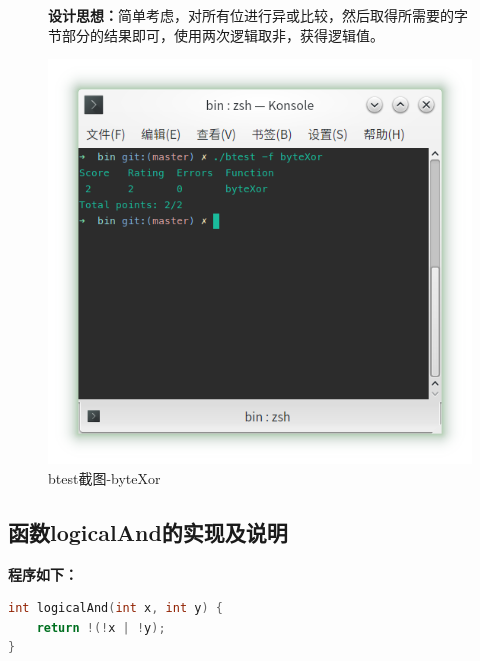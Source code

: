 \begin{figure}[H]
\begin{minipage}[c]{0.5\linewidth}
		
\textbf{设计思想：}简单考虑，对所有位进行异或比较，然后取得所需要的字节部分的结果即可，使用两次逻辑取非，获得逻辑值。
		
\end{minipage}
\begin{minipage}[c]{0.4\linewidth}
\centering
\includegraphics[width=0.9\linewidth]{figures/byteXor}
\caption{btest截图-byteXor}
\label{fig:byteXor}
\end{minipage}
\end{figure}

\subsection{函数logicalAnd的实现及说明}
\textbf{程序如下：}
\begin{lstlisting}[language = c]
int logicalAnd(int x, int y) {
	return !(!x | !y);
}
\end{lstlisting}

